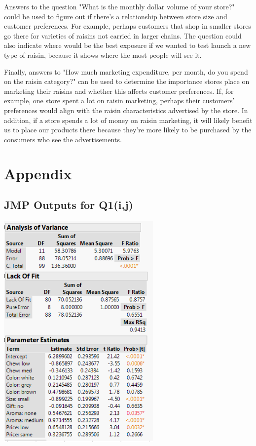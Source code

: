 \documentclass[10pt, oneside,spanish]{article}
\begin{document}
Answers to the question "What is the monthly dollar volume of your store?" could be used to figure out if there's a relationship between store size and customer preferences.  For example, perhaps customers that shop in smaller stores go there for varieties of raisins not carried in larger chains.  The question could also indicate where would be the best exposure if we wanted to test launch a new type of raisin, because it shows where the most people will see it.

Finally, answers to "How much marketing expenditure, per month, do you spend on the raisin category?" can be used to determine the importance stores place on marketing their raisins and whether this affects customer preferences.  If, for example, one store spent a lot on raisin marketing, perhaps their customers' preferences would align with the raisin characteristics advertised by the store.  In addition, if a store spends a lot of money on raisin marketing, it will likely benefit us to place our products there because they're more likely to be purchased by the consumers who see the advertisements.

\pagebreak

\section{Appendix}

\subsection{JMP Outputs for Q1(i,j)}

\begin{center}
\includegraphics[width=8cm]{1j.PNG}
\end{center}
\end{document}
